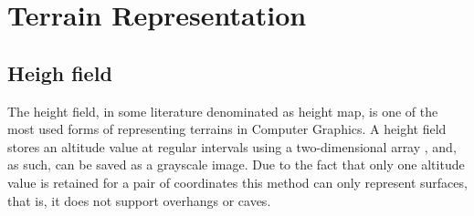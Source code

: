 


\section{Terrain Representation}


\subsection{Heigh field}
The height field, in some literature denominated as height map, is one of the most used forms of representing terrains in Computer Graphics. A height field stores an altitude value at regular intervals using a two-dimensional array \cite{Ebert2003}, and, as such, can be saved as a grayscale image. Due to the fact that only one altitude value is retained for a pair of coordinates this method can only represent surfaces, that is, it does not support overhangs or caves. 




